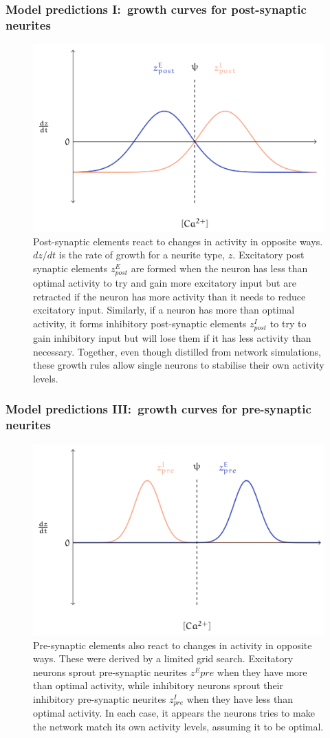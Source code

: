 \begin{frame}[c]
  \frametitle{Model predictions I:\ growth curves for post-synaptic neurites}
  \begin{figure}[h]
    \centering
    \includegraphics[width=0.55\linewidth]{99_images/growth-post}
    \caption{Post-synaptic elements react to changes in activity in opposite ways. \(dz/dt\) is the rate of growth for a neurite type, \(z\). Excitatory post synaptic elements \(z^E_{post}\) are formed when the neuron has less than optimal activity to try and gain more excitatory input but are retracted if the neuron has more activity than it needs to reduce excitatory input. Similarly, if a neuron has more than optimal activity, it forms inhibitory post-synaptic elements \(z^I_{post}\) to try to gain inhibitory input but will lose them if it has less activity than necessary. Together, even though distilled from network simulations, these growth rules allow single neurons to stabilise their own activity levels.}
  \end{figure}
\end{frame}
\begin{frame}[c]
  \frametitle{Model predictions III:\ growth curves for pre-synaptic neurites}
  \begin{figure}[h]
    \centering
    \includegraphics[width=0.55\linewidth]{99_images/growth-pre}
    \caption{Pre-synaptic elements also react to changes in activity in opposite ways. These were derived by a limited grid search. Excitatory neurons sprout pre-synaptic neurites \(z^E{pre}\) when they have more than optimal activity, while inhibitory neurons sprout their inhibitory pre-synaptic neurites \(z^I_{pre}\) when they have less than optimal activity. In each case, it appears the neurons tries to make the network match its own activity levels, assuming it to be optimal.}
  \end{figure}
\end{frame}
